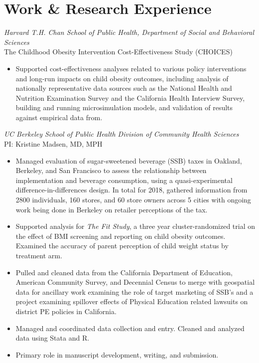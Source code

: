 \documentclass{cv_style}
\begin{document}
\section{Work \& Research Experience}
\textit{Harvard T.H. Chan School of Public Health, Department of Social and Behavioral Sciences} \\
The Childhood Obesity Intervention Cost-Effectiveness Study (CHOICES)
\begin{itemize}
    \item Supported cost-effectiveness analyses related to various policy interventions and long-run impacts on child obesity outcomes, including analysis of nationally representative data sources such as the National Health and Nutrition Examination Survey and the California Health Interview Survey, building and running microsimulation models, and validation of results against empirical data from.
\end{itemize}

\textit{UC Berkeley School of Public Health Division of Community Health Sciences} \\
PI: Kristine Madsen, MD, MPH
\begin{itemize}
    \item Managed evaluation of sugar-sweetened beverage (SSB) taxes in Oakland, Berkeley, and San Francisco to assess the relationship between implementation and beverage consumption, using a quasi-experimental difference-in-differences design. In total for 2018, gathered information from 2800 individuals, 160 stores, and 60 store owners across 5 cities with ongoing work being done in Berkeley on retailer perceptions of the tax.
    \item \parskip 1pt Supported analysis for \textit{The Fit Study}, a three year cluster-randomized trial on the effect of BMI screening and reporting on child obesity outcomes. Examined the accuracy of parent perception of child weight status by treatment arm.
    \item \parskip 1pt Pulled and cleaned data from the California Department of Education, American Community Survey, and Decennial Census to merge with geospatial data for ancillary work examining the role of target marketing of SSB's and a project examining spillover effects of Physical Education related lawsuits on district PE policies in California.
    \item \parskip 1pt Managed and coordinated data collection and entry. Cleaned and analyzed data using Stata and R.
    \item \parskip 1pt Primary role in manuscript development, writing, and submission.
\end{itemize}
\end{document}
